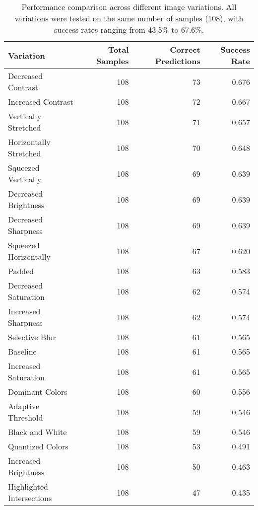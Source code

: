 \begin{table*}
  \centering
  \begin{tabular}{lrrr}
    \hline
    \textbf{Variation} & \textbf{Total Samples} & \textbf{Correct Predictions} & \textbf{Success Rate} \\
    \hline
    Decreased Contrast & 108 & 73 & 0.676 \\
    Increased Contrast & 108 & 72 & 0.667 \\
    Vertically Stretched & 108 & 71 & 0.657 \\
    Horizontally Stretched & 108 & 70 & 0.648 \\
    Squeezed Vertically & 108 & 69 & 0.639 \\
    Decreased Brightness & 108 & 69 & 0.639 \\
    Decreased Sharpness & 108 & 69 & 0.639 \\
    Squeezed Horizontally & 108 & 67 & 0.620 \\
    Padded & 108 & 63 & 0.583 \\
    Decreased Saturation & 108 & 62 & 0.574 \\
    Increased Sharpness & 108 & 62 & 0.574 \\
    Selective Blur & 108 & 61 & 0.565 \\
    Baseline & 108 & 61 & 0.565 \\
    Increased Saturation & 108 & 61 & 0.565 \\
    Dominant Colors & 108 & 60 & 0.556 \\
    Adaptive Threshold & 108 & 59 & 0.546 \\
    Black and White & 108 & 59 & 0.546 \\
    Quantized Colors & 108 & 53 & 0.491 \\
    Increased Brightness & 108 & 50 & 0.463 \\
    Highlighted Intersections & 108 & 47 & 0.435 \\
    \hline
  \end{tabular}
  \caption{\label{tab:variation-results}
    Performance comparison across different image variations. All variations were tested on the same number of samples (108), with success rates ranging from 43.5\% to 67.6\%.
  }
\end{table*}
